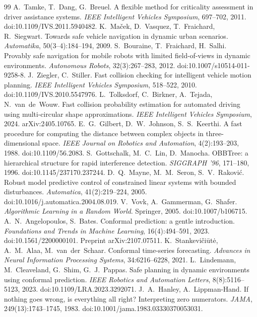 \documentclass[11pt]{article}
\theoremstyle{definition}
\theoremstyle{remark}
\begin{document}
\begin{thebibliography}{99}
 A.~Tamke, T.~Dang, G.~Breuel. A flexible method for criticality assessment in driver assistance systems. \emph{IEEE Intelligent Vehicles Symposium}, 697--702, 2011. doi:10.1109/IVS.2011.5940482.
 K.~Ma\v{c}ek, D.~Vasquez, T.~Fraichard, R.~Siegwart. Towards safe vehicle navigation in dynamic urban scenarios. \emph{Automatika}, 50(3--4):184--194, 2009.
 S.~Bouraine, T.~Fraichard, H.~Salhi. Provably safe navigation for mobile robots with limited field-of-views in dynamic environments. \emph{Autonomous Robots}, 32(3):267--283, 2012. doi:10.1007/s10514-011-9258-8.
 J.~Ziegler, C.~Stiller. Fast collision checking for intelligent vehicle motion planning. \emph{IEEE Intelligent Vehicles Symposium}, 518--522, 2010. doi:10.1109/IVS.2010.5547976.
 L.~Tolksdorf, C.~Birkner, A.~Tejada, N.~van~de~Wouw. Fast collision probability estimation for automated driving using multi-circular shape approximations. \emph{IEEE Intelligent Vehicles Symposium}, 2024. arXiv:2405.10765.
 E.~G.~Gilbert, D.~W.~Johnson, S.~S.~Keerthi. A fast procedure for computing the distance between complex objects in three-dimensional space. \emph{IEEE Journal on Robotics and Automation}, 4(2):193--203, 1988. doi:10.1109/56.2083.
 S.~Gottschalk, M.~C.~Lin, D.~Manocha. OBBTree: a hierarchical structure for rapid interference detection. \emph{SIGGRAPH '96}, 171--180, 1996. doi:10.1145/237170.237244.
 D.~Q.~Mayne, M.~M.~Seron, S.~V.~Rakovi\'c. Robust model predictive control of constrained linear systems with bounded disturbances. \emph{Automatica}, 41(2):219--224, 2005. doi:10.1016/j.automatica.2004.08.019.
 V.~Vovk, A.~Gammerman, G.~Shafer. \emph{Algorithmic Learning in a Random World}. Springer, 2005. doi:10.1007/b106715.
 A.~N.~Angelopoulos, S.~Bates. Conformal prediction: a gentle introduction. \emph{Foundations and Trends in Machine Learning}, 16(4):494--591, 2023. doi:10.1561/2200000101. Preprint arXiv:2107.07511.
 K.~Stankevi\v{c}i\={u}t\.{e}, A.~M.~Alaa, M.~van~der~Schaar. Conformal time-series forecasting. \emph{Advances in Neural Information Processing Systems}, 34:6216--6228, 2021.
 L.~Lindemann, M.~Cleaveland, G.~Shim, G.~J.~Pappas. Safe planning in dynamic environments using conformal prediction. \emph{IEEE Robotics and Automation Letters}, 8(8):5116--5123, 2023. doi:10.1109/LRA.2023.3292071.
 J.~A.~Hanley, A.~Lippman-Hand. If nothing goes wrong, is everything all right? Interpreting zero numerators. \emph{JAMA}, 249(13):1743--1745, 1983. doi:10.1001/jama.1983.03330370053031.

\end{thebibliography}
\end{document}
